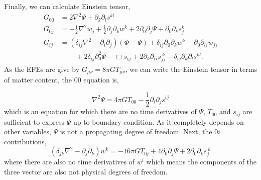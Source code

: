 Finally, we can calculate Einstein tensor,
\begin{equation}\label{einstein-tensor-pert-components}
\begin{split}
    G_{00} &= 2\nabla^2\Psi + \partial_k\partial_ls^{kl}\\
    G_{0j} &= -\frac{1}{2}\nabla^2w_j + \frac{1}{2}\partial_j\partial_kw^k + 2\partial_0\partial_j\Psi +\partial_0\partial_ks_j^k \\
    G_{ij} &= (\delta_{ij}\nabla^2 - \partial_i\partial_j)(\Phi - \Psi) + \delta_{ij}\partial_0\partial_kw^k - \partial_0\partial_{(i}w_{j)}\\
    &\ \ \ \ \ \ \ \ \ \ + 2\delta_{ij}\partial_0^2\Psi - \Box s_{ij} + 2\partial_k\partial_{(i}s_{j)}^{\ k} -\delta_{ij}\partial_k\partial_ls^{kl}.
\end{split}
\end{equation}
As the EFEs are give by $G_{\mu\nu} = 8\pi G T_{\mu\nu}$, we can write the Einstein tensor in terms of matter content, the $00$ equation is,

\begin{equation}\nonumber
    \nabla^2\Psi = 4\pi GT_{00} -\frac{1}{2}\partial_i\partial_js^{ij}
\end{equation}
which is an equation for which there are no time derivatives of $\Psi$, $T_{00}$ and $s_{ij}$ are sufficient to express $\Psi$ up to boundary condition. As it completely depends on other variables, $\Psi$ is not a propagating degree of freedom. Next, the $0i$ contributions,
\begin{equation}\nonumber
    \left(\delta_{jk}\nabla^2 - \partial_j\partial_k \right)w^k = -16\pi GT_{0j} + 4\partial_0\partial_j\Psi + 2\partial_0\partial_ks_{j}^{\ k}
\end{equation}
where there are also no time derivatives of $w^i$ which means the components of the three vector are also not physical degrees of freedom. 

